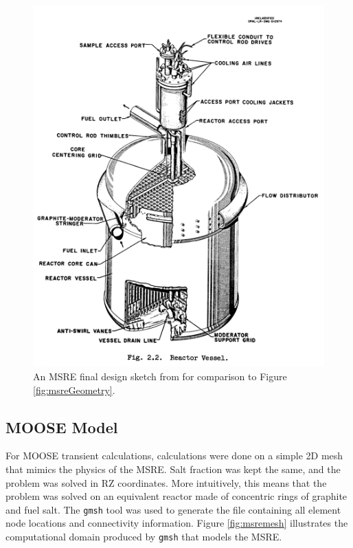 \begin{figure}[ht]
\includegraphics[width=\textwidth]{actualMSRE.png}
\caption{An MSRE final design sketch from \cite{robertson_msre} for comparison to Figure \ref{fig:msreGeometry}.}
\label{fig:actualMSRE}
\end{figure}

\subsection{MOOSE Model}
For MOOSE transient calculations, calculations were done on a simple 2D mesh that mimics the physics of the MSRE. Salt fraction was kept the same, and the problem was solved in RZ coordinates. More intuitively, this means that the problem was solved on an equivalent reactor made of concentric rings of graphite and fuel salt.
The \texttt{gmsh} \cite{gmsh} tool was used to generate the file containing all element node locations and connectivity information.
Figure \ref{fig:msremesh} illustrates the computational domain produced by \texttt{gmsh} that models the MSRE.

